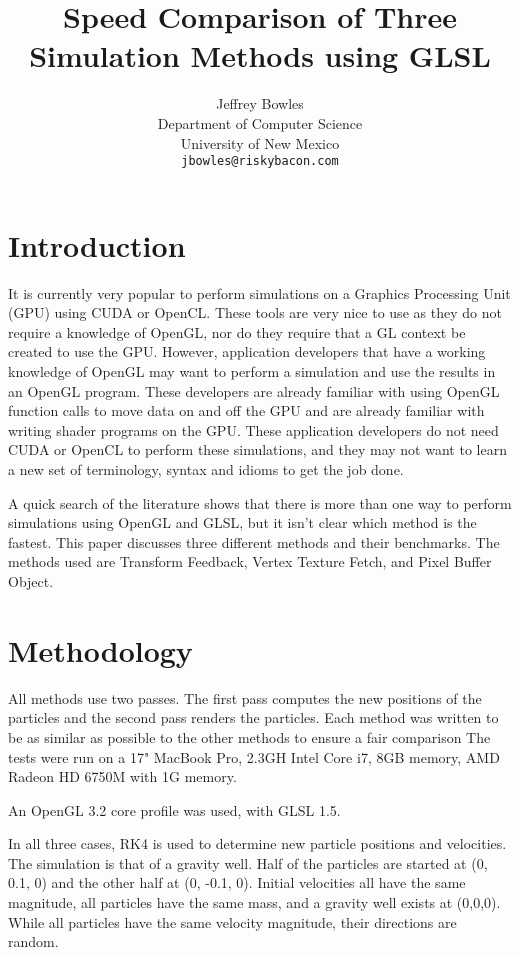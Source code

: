 \documentclass{article}
\begin{document}
\title{Speed Comparison of Three Simulation Methods using GLSL}
\author{Jeffrey Bowles\\
  Department of Computer Science \\
  University of New Mexico\\
  \texttt{jbowles@riskybacon.com}}
\maketitle

\section{Introduction}
It is currently very popular to perform simulations on a Graphics Processing Unit (GPU) using CUDA or OpenCL. These tools are very nice to use as they do not require a knowledge of OpenGL, nor do they require that a GL context be created to use the GPU. However, application developers that have a working knowledge of OpenGL may want to perform a simulation and use the results in an OpenGL program. These developers are already familiar with using OpenGL function calls to move data on and off the GPU and are already familiar with writing shader programs on the GPU. These application developers do not need CUDA or OpenCL to perform these simulations, and they may not want to learn a new set of terminology, syntax and idioms to get the job done.

A quick search of the literature shows that there is more than one way to perform simulations using OpenGL and GLSL, but it isn't clear which method is the fastest. This paper discusses three different methods and their benchmarks. The methods used are Transform Feedback, Vertex Texture Fetch, and Pixel Buffer Object. 


\section{Methodology}
All methods use two passes. The first pass computes the new
positions of the particles and the second pass renders the
particles. Each method was written to be as similar as possible to the other methods to ensure a fair comparison
The tests were run on a 17" MacBook Pro,
2.3GH Intel Core i7, 8GB memory, AMD Radeon HD 6750M with 1G memory.

An OpenGL 3.2 core profile was used, with GLSL 1.5.

In all three cases, RK4 is used to determine new particle positions
and velocities. The simulation is that of a gravity well. Half of the
particles are started at (0, 0.1, 0) and the other half at (0, -0.1, 0).
Initial velocities all have the same magnitude, all particles have the
same mass, and a gravity well exists at (0,0,0). While all particles
have the same velocity magnitude, their directions are random.
\end{document}
